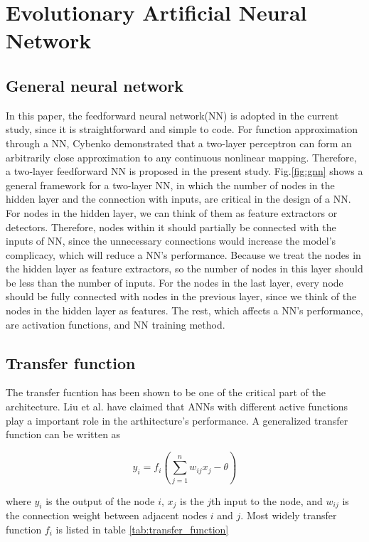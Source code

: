 \section{Evolutionary Artificial Neural Network}

\subsection{General neural network}
In this paper, the feedforward neural network(NN) is adopted in the current
study, since it is straightforward and simple to code. For function
approximation through a NN, Cybenko demonstrated that a two-layer perceptron
can form an arbitrarily close approximation to any continuous nonlinear
mapping\cite{cybenko1989approximation}. Therefore, a two-layer feedforward NN
is proposed in the present study. Fig.\ref{fig:gnn} shows a general framework for a
two-layer NN, in which the number of nodes in the hidden layer and the
connection with inputs, are critical in the design of a NN. For nodes in the
hidden layer, we can think of them as feature extractors or detectors.
Therefore, nodes within it should partially be connected with the inputs of NN,
since the unnecessary connections would increase the model's complicacy, which
will reduce a NN’s performance. Because we treat the nodes in the hidden layer
as feature extractors, so the number of nodes in this layer should be less than
the number of inputs. For the nodes in the last layer, every node should be
fully connected with nodes in the previous layer, since we think of the nodes
in the hidden layer as features. The rest, which affects a NN’s performance,
are activation functions, and NN training method.




\subsection{Transfer function}
The transfer fucntion has been shown to be one of the critical part of the
architecture. Liu \cite{liu1996evolutionary} et al. have claimed that ANNs with
different active functions play a important role in the arthitecture's performance.
A generalized transfer function can be written as

\begin{equation}
	y_i = f_i(\sum_{j=1}^n{w_{ij}x_j - \theta})
\end{equation}

where $y_i$ is the output of the node $i$, $x_j$ is the $j$th input to the node,
and $w_{ij}$ is the connection weight between adjacent nodes $i$ and $j$. Most
widely transfer function  $f_i$ is listed in table \ref{tab:transfer_function}


